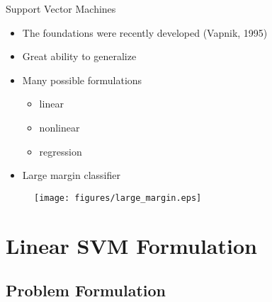 \documentclass{beamer}
\begin{document}
\begin{frame}{Support Vector Machines}
    \begin{itemize}
        \item The foundations were recently developed (Vapnik, 1995)
        \item Great ability to generalize~\cite{Gunn1998}
        \item Many possible formulations
            \begin{itemize}
                \item \alert{linear}
                \item nonlinear
                \item regression
            \end{itemize}
        \item \alert{Large margin} classifier
    \end{itemize}

    \begin{figure}[!htb]
        \centering\vspace{-.3cm}
        \texttt{[image: figures/large\_margin.eps]}
    \end{figure}
\end{frame}


\section{Linear SVM Formulation}

\subsection{Problem Formulation}
\end{document}
